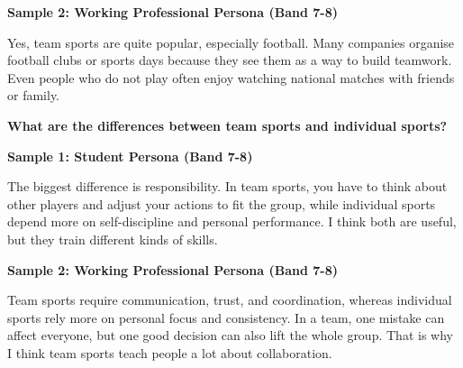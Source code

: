 \textbf{Sample 2: Working Professional Persona (Band 7-8)}

Yes, team sports are quite popular, especially football. Many companies organise football clubs or sports days because they see them as a way to build teamwork. Even people who do not play often enjoy watching national matches with friends or family.

\separator

\begin{ieltsquestion}
\textbf{What are the differences between team sports and individual sports?}
\end{ieltsquestion}
\textbf{Sample 1: Student Persona (Band 7-8)}

The biggest difference is responsibility. In team sports, you have to think about other players and adjust your actions to fit the group, while individual sports depend more on self-discipline and personal performance. I think both are useful, but they train different kinds of skills.

\textbf{Sample 2: Working Professional Persona (Band 7-8)}

Team sports require communication, trust, and coordination, whereas individual sports rely more on personal focus and consistency. In a team, one mistake can affect everyone, but one good decision can also lift the whole group. That is why I think team sports teach people a lot about collaboration.

\separator


